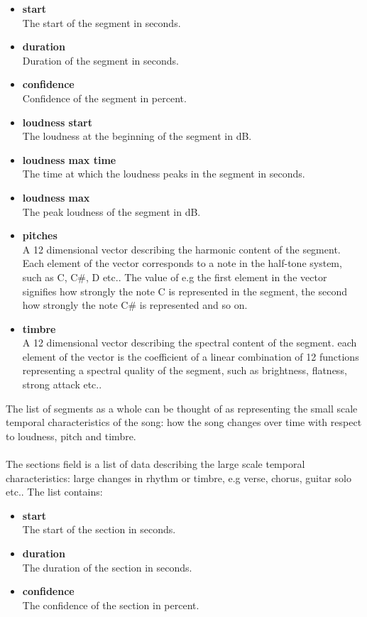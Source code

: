 \begin{itemize}
	\item \textbf{start} \\The start of the segment in seconds.
	\item \textbf{duration} \\Duration of the segment in seconds.
	\item \textbf{confidence} \\Confidence of the segment in percent.
	\item \textbf{loudness start} \\The loudness at the beginning of the segment in dB.
	\item \textbf{loudness max time} \\The time at which the loudness peaks in the segment in seconds.
	\item \textbf{loudness max} \\The peak loudness of the segment in dB.
	\item \textbf{pitches} \\A 12 dimensional vector describing the harmonic content of the segment. Each element of the vector corresponds to a note in the half-tone system, such as C, C\#, D etc.. The value of e.g the first element in the vector signifies how strongly the note C is represented in the segment, the second how strongly the note C\# is represented and so on.
	\item \textbf{timbre} \\A 12 dimensional vector describing the spectral content of the segment. each element of the vector is the coefficient of a linear combination of 12 functions representing a spectral quality of the segment, such as brightness, flatness, strong attack etc..
\end{itemize}
\noindent The list of segments as a whole can be thought of as representing the small scale temporal characteristics of the song: how the song changes over time with respect to loudness, pitch and timbre.
\\\\
The sections field is a list of data describing the large scale temporal characteristics: large changes in rhythm or timbre, e.g verse, chorus, guitar solo etc.. The list contains:
\begin{itemize}
	\item \textbf{start} \\The start of the section in seconds.
	\item \textbf{duration} \\The duration of the section in seconds.
	\item \textbf{confidence} \\The confidence of the section in percent.
\end{itemize}
